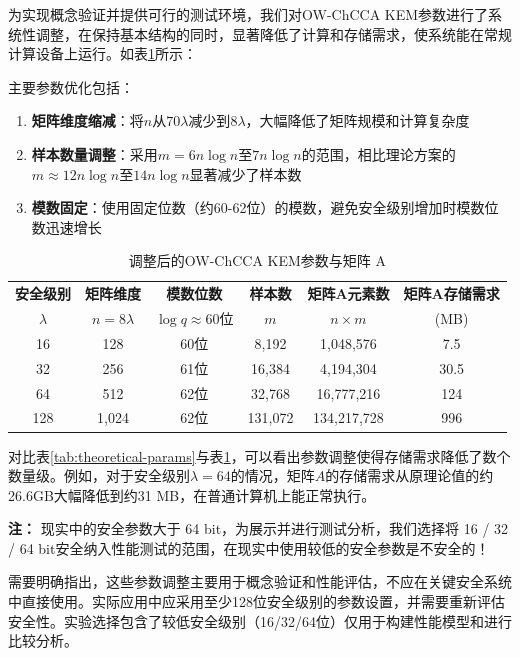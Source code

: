 为实现概念验证并提供可行的测试环境，我们对OW-ChCCA KEM参数进行了系统性调整，在保持基本结构的同时，显著降低了计算和存储需求，使系统能在常规计算设备上运行。如表\ref{tab:practical-params}所示：

主要参数优化包括：
\begin{enumerate}
  \item \textbf{矩阵维度缩减}：将$n$从$70\lambda$减少到$8\lambda$，大幅降低了矩阵规模和计算复杂度

  \item \textbf{样本数量调整}：采用$m = 6n\log n$至$7n\log n$的范围，相比理论方案的$m \approx 12n\log n$至$14n\log n$显著减少了样本数
  
  \item \textbf{模数固定}：使用固定位数（约60-62位）的模数，避免安全级别增加时模数位数迅速增长
\end{enumerate}

\begin{table}[ht]
  \centering
  \caption{调整后的OW-ChCCA KEM参数与矩阵 A}
  \label{tab:practical-params}
  \begin{tabular}{|c|c|c|c|c|c|}
  \hline
  \textbf{安全级别} & \textbf{矩阵维度} & \textbf{模数位数} & \textbf{样本数} & \textbf{矩阵A元素数} & \textbf{矩阵A存储需求} \\
  $\lambda$ & $n = 8\lambda$ & $\log q \approx 60$位 & $m$ & $n \times m$ & (MB) \\
  \hline
  16 & 128 & 60位 & 8,192 & 1,048,576 & 7.5  \\
  \hline
  32 & 256 & 61位 & 16,384 & 4,194,304 & 30.5 \\
  \hline
  64 & 512 & 62位 & 32,768 & 16,777,216 & 124 \\
  \hline
  128 & 1,024 & 62位 & 131,072 & 134,217,728 & 996 \\
  \hline
  \end{tabular}
\end{table}

对比表\ref{tab:theoretical-params}与表\ref{tab:practical-params}，可以看出参数调整使得存储需求降低了数个数量级。例如，对于安全级别$\lambda=64$的情况，矩阵$A$的存储需求从原理论值的约26.6GB大幅降低到约31 MB，在普通计算机上能正常执行。

\textbf{注：} 现实中的安全参数大于 64 bit，为展示并进行测试分析，我们选择将 16 / 32 / 64 bit安全纳入性能测试的范围，在现实中使用较低的安全参数是不安全的！

需要明确指出，这些参数调整主要用于概念验证和性能评估，不应在关键安全系统中直接使用。实际应用中应采用至少128位安全级别的参数设置，并需要重新评估安全性。实验选择包含了较低安全级别（16/32/64位）仅用于构建性能模型和进行比较分析。

